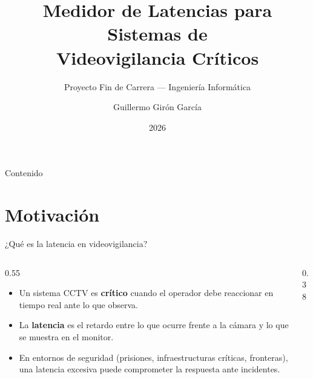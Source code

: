 \documentclass[aspectratio=169,11pt]{beamer}
\title[Medidor de Latencias CCTV]{Medidor de Latencias para Sistemas de\\Videovigilancia Críticos}
\subtitle{Proyecto Fin de Carrera — Ingeniería Informática}
\author{Guillermo Girón García}
\institute{Escuela Superior de Ingeniería\\Universidad de Cádiz}
\date{2026}
\begin{document}
\begin{frame}
\titlepage
\end{frame}

\begin{frame}{Contenido}
\tableofcontents
\end{frame}

\section{Motivación}

\begin{frame}{¿Qué es la latencia en videovigilancia?}

\begin{columns}[T]
\begin{column}{0.55\textwidth}
\begin{itemize}
    \item Un sistema CCTV es \textbf{crítico} cuando el operador debe reaccionar en tiempo real ante lo que observa.
    \item La \textbf{latencia} es el retardo entre lo que ocurre frente a la cámara y lo que se muestra en el monitor.
    \item En entornos de seguridad (prisiones, infraestructuras críticas, fronteras), una latencia excesiva puede comprometer la respuesta ante incidentes.
\end{itemize}
\end{column}
\begin{column}{0.38\textwidth}
\end{column}
\end{columns}

\end{frame}
\end{document}
